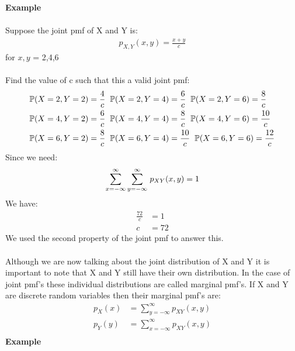 \documentclass[,oneside]{article}
\begin{document}
\begin{enumerate}
\textbf{Example}\\ \\
Suppose the joint pmf of X and Y is:
\begin{align*}
p_{X,Y}(x,y) = \frac{x+y}{c}
\end{align*}
for $x, y$ = 2,4,6\\ \\
Find the value of c such that this a valid joint pmf:
\begin{align*}
&\mathbb{P}(X = 2, Y = 2) = \frac{4}{c} \hspace{0.2cm} \mathbb{P}(X = 2, Y = 4) = \frac{6}{c} \hspace{0.2cm} \mathbb{P}(X = 2, Y = 6) = \frac{8}{c}\\
&\mathbb{P}(X = 4, Y = 2) = \frac{6}{c} \hspace{0.2cm} \mathbb{P}(X = 4, Y = 4) = \frac{8}{c} \hspace{0.2cm} \mathbb{P}(X = 4, Y = 6) = \frac{10}{c}\\
&\mathbb{P}(X = 6, Y = 2) = \frac{8}{c} \hspace{0.2cm} \mathbb{P}(X = 6, Y = 4) = \frac{10}{c}\hspace{0.2cm}  \mathbb{P}(X = 6, Y = 6) = \frac{12}{c}
\end{align*}
Since we need:
\begin{align*}
\sum\limits_{x=-\infty}^{\infty}\sum\limits_{y=-\infty}^{\infty}\hspace{0.05cm}p_{XY}(x,y) = 1
\end{align*}
We have:
\begin{align*}
\frac{72}{c}&=1\\
c&=72
\end{align*}
We used the second property of the joint pmf to answer this.\\ \\
Although we are now talking about the joint distribution of X and Y it is important to note that X and Y still have their own distribution. In the case of joint pmf's these individual distributions are called marginal pmf's. If X and Y are discrete random variables then their marginal pmf's are:
\begin{align*}
p_X(x)&=\sum\limits_{y=-\infty}^{\infty}p_{XY}(x,y)\\
p_Y(y)&=\sum\limits_{x=-\infty}^{\infty}p_{XY}(x,y)\\
\end{align*}
\pagebreak
\textbf{Example}\\ \\

\end{enumerate}
\end{document}
